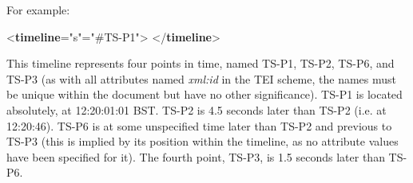 For example: \par\bgroup{}\exampleFont \begin{shaded}\noindent\mbox{}{<\textbf{timeline}\hspace*{1em}{unit}="{s}"\hspace*{1em}{origin}="{\#TS-P1}">}\mbox{}\newline 
{}\mbox{}\newline 
{}\mbox{}\newline 
{}\mbox{}\newline 
{}\mbox{}\newline 
{</\textbf{timeline}>}\end{shaded}\egroup\par \noindent  This timeline represents four points in time, named TS-P1, TS-P2, TS-P6, and TS-P3 (as with all attributes named {\itshape xml:id} in the TEI scheme, the names must be unique within the document but have no other significance). TS-P1 is located absolutely, at 12:20:01:01 BST. TS-P2 is 4.5 seconds later than TS-P2 (i.e. at 12:20:46). TS-P6 is at some unspecified time later than TS-P2 and previous to TS-P3 (this is implied by its position within the timeline, as no attribute values have been specified for it). The fourth point, TS-P3, is 1.5 seconds later than TS-P6.\par

